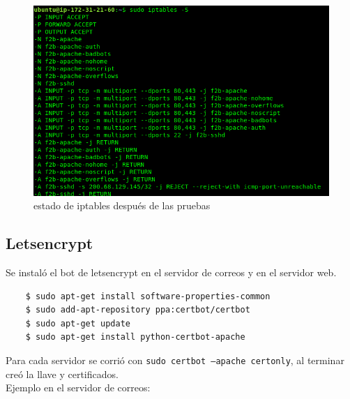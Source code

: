 \documentclass[12pt]{article}
\begin{document}
\begin{figure}[H]
  \centering
  \includegraphics[scale=0.3]{fail2ban/new_iptables_with_ban}
  \caption{estado de iptables después de las pruebas}
\end{figure}

\subsection{Letsencrypt}

Se instaló el bot de \textsf{letsencrypt} en el servidor de correos y en el servidor web.

\begin{verbatim}
    $ sudo apt-get install software-properties-common
    $ sudo add-apt-repository ppa:certbot/certbot
    $ sudo apt-get update
    $ sudo apt-get install python-certbot-apache 
\end{verbatim}

Para cada servidor se corrió con \texttt{sudo certbot --apache certonly}, al terminar creó la llave y certificados. \\

Ejemplo en el servidor de correos:
\end{document}
